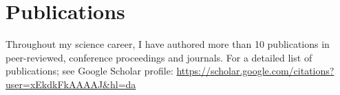 \section{Publications}
Throughout my science career, I have authored more than 10 publications in peer-reviewed, conference proceedings and journals. For a detailed list of publications; see Google Scholar profile: 
\href{https://scholar.google.com/citations?user=xEkdkFkAAAAJ&hl=da}{https://scholar.google.com/citations?user=xEkdkFkAAAAJ&hl=da}